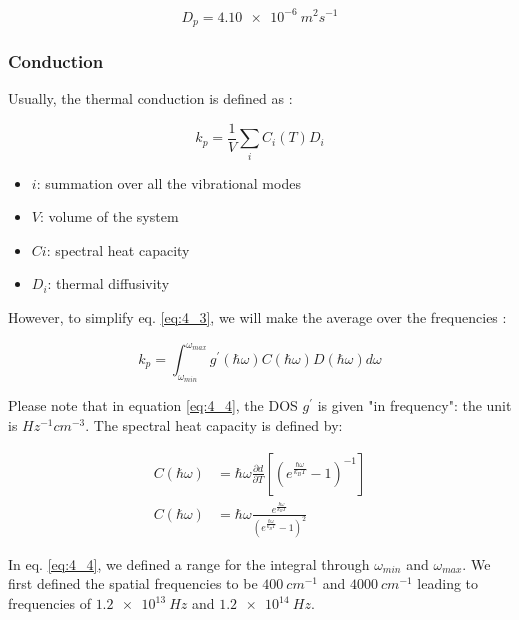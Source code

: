 \begin{equation}
    D_p = \SI{4.10e-6}{m^2 s^{-1}}
    \label{eq:4_2}
\end{equation}

\subsubsection{Conduction}

Usually, the thermal conduction is defined as \cite{phonon_physics}:

\begin{equation}
    k_p = \frac{1}{V} \sum_i C_i(T)D_i
    \label{eq:4_3}
\end{equation}

\begin{itemize}
    \item $i$: summation over all the vibrational modes
    \item $V$: volume of the system
    \item $Ci$: spectral heat capacity
    \item $D_i$: thermal diffusivity
\end{itemize}

However, to simplify eq. \ref{eq:4_3}, we will make the average over the frequencies \cite{thermal_the_one}:

\begin{equation}
    k_p = \int_{\omega_{min}}^{\omega_{max}} g^\prime (\hbar\omega) C(\hbar\omega)D(\hbar\omega) d \omega
    \label{eq:4_4}
\end{equation}

Please note that in equation \ref{eq:4_4}, the DOS $g^\prime$ is given "in frequency": the unit is $\si{Hz^{-1} cm^{-3}}$. The spectral heat capacity is defined by:

\begin{equation}
    \begin{aligned}
        C(\hbar\omega) &= \hbar \omega \frac{\partial d}{\partial T} \left[\left(e^{\frac{\hbar \omega}{k_BT}} - 1\right)^{-1}\right] \\
        C(\hbar\omega) &= \hbar\omega \frac{e^{\frac{\hbar\omega}{k_BT}}}{\left(e^{\frac{\hbar\omega}{k_BT}} - 1\right)^2}
    \end{aligned}
    \label{eq:4_5}
\end{equation}

In eq. \ref{eq:4_4}, we defined a range for the integral through $\omega_{min}$ and $\omega_{max}$. We first defined the spatial frequencies to be $\SI{400}{cm^{-1}}$ and $\SI{4000}{cm^{-1}}$ leading to frequencies of $\SI{1.2e13}{Hz}$ and $\SI{1.2e14}{Hz}$.

